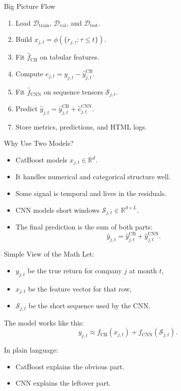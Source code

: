 \documentclass[aspectratio=169]{beamer}
\newcommand{\D}{\mathcal{D}}
\newcommand{\haty}{\hat{y}}
\newcommand{\seq}{\mathcal{S}}
\begin{document}
\begin{frame}{Big Picture Flow}
  \begin{enumerate}
    \item Load $\D_{\mathrm{train}}$, $\D_{\mathrm{val}}$, and $\D_{\mathrm{test}}$.
    \item Build $x_{j,t}=\phi(\{r_{j,\tau}:\tau\le t\})$.
    \item Fit $\hat f_{\mathrm{CB}}$ on tabular features.
    \item Compute $e_{j,t}=y_{j,t}-\hat y^{\mathrm{CB}}_{j,t}$.
    \item Fit $\hat f_{\mathrm{CNN}}$ on sequence tensors $\seq_{j,t}$.
    \item Predict $\hat y_{j,t}=\hat y^{\mathrm{CB}}_{j,t}+\hat e^{\mathrm{CNN}}_{j,t}$.
    \item Store metrics, predictions, and HTML logs.
  \end{enumerate}
\end{frame}

\begin{frame}{Why Use Two Models?}
  \begin{itemize}
    \item CatBoost models $x_{j,t} \in \mathbb{R}^d$.
    \item It handles numerical and categorical structure well.
    \item Some signal is temporal and lives in the residuals.
    \item CNN models short windows $\seq_{j,t} \in \mathbb{R}^{d \times L}$.
    \item The final prediction is the sum of both parts:
    \[
      \haty_{j,t} = \haty^{\mathrm{CB}}_{j,t} + \haty^{\mathrm{CNN}}_{j,t}.
    \]
  \end{itemize}
\end{frame}

\begin{frame}{Simple View of the Math}
  Let:
  \begin{itemize}
    \item $y_{j,t}$ be the true return for company $j$ at month $t$,
    \item $x_{j,t}$ be the feature vector for that row,
    \item $\seq_{j,t}$ be the short sequence used by the CNN.
  \end{itemize}

  The model works like this:
  \[
    y_{j,t} \approx f_{\mathrm{CB}}(x_{j,t}) + f_{\mathrm{CNN}}(\seq_{j,t}).
  \]

  In plain language:
  \begin{itemize}
    \item CatBoost explains the obvious part.
    \item CNN explains the leftover part.
  \end{itemize}
\end{frame}
\end{document}
